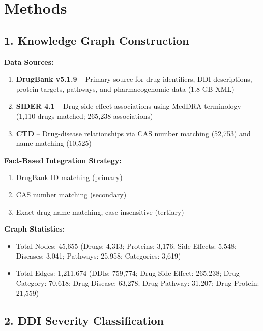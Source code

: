 \documentclass[11pt,a4paper]{article}
\begin{document}
\section*{Methods}

\subsection*{1. Knowledge Graph Construction}

\textbf{Data Sources:}
\begin{enumerate}[label=(\roman*)]
    \item \textbf{DrugBank v5.1.9} -- Primary source for drug identifiers, DDI descriptions, protein targets, pathways, and pharmacogenomic data (1.8 GB XML)
    \item \textbf{SIDER 4.1} -- Drug-side effect associations using MedDRA terminology (1,110 drugs matched; 265,238 associations)
    \item \textbf{CTD} -- Drug-disease relationships via CAS number matching (52,753) and name matching (10,525)
\end{enumerate}

\textbf{Fact-Based Integration Strategy:}
\begin{enumerate}[label=(\roman*)]
    \item DrugBank ID matching (primary)
    \item CAS number matching (secondary)
    \item Exact drug name matching, case-insensitive (tertiary)
\end{enumerate}

\textbf{Graph Statistics:}
\begin{itemize}
    \item Total Nodes: 45,655 (Drugs: 4,313; Proteins: 3,176; Side Effects: 5,548; Diseases: 3,041; Pathways: 25,958; Categories: 3,619)
    \item Total Edges: 1,211,674 (DDIs: 759,774; Drug-Side Effect: 265,238; Drug-Category: 70,618; Drug-Disease: 63,278; Drug-Pathway: 31,207; Drug-Protein: 21,559)
\end{itemize}

\subsection*{2. DDI Severity Classification}
\end{document}
